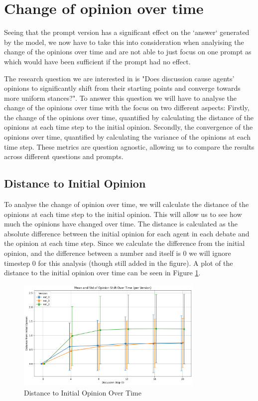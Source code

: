 \documentclass[12pt]{article}
\begin{document}
\section{Change of opinion over time}
Seeing that the prompt version has a significant effect on the `answer` generated by the model, we now have to take this into consideration when analyising the change of the opinions over time and are not able to just focus on one prompt as which would have been sufficient if the prompt had no effect.

The research question we are interested in is "Does discussion cause agents' opinions to significantly shift from their starting points and converge towards more uniform stances?". To answer this question we will have to analyse the change of the opinions over time with the focus on two different aspects: Firstly, the change of the opinions over time, quantified by calculating the distance of the opinions at each time step to the initial opinion. Secondly, the convergence of the opinions over time, quantified by calculating the variance of the opinions at each time step. These metrics are question agnostic, allowing us to compare the results across different questions and prompts.

\subsection{Distance to Initial Opinion}

To analyse the change of opinion over time, we will calculate the distance of the opinions at each time step to the initial opinion. This will allow us to see how much the opinions have changed over time. The distance is calculated as the absolute difference between the initial opinion for each agent in each debate and the opinion at each time step. Since we calculate the difference from the initial opinion, and the difference between a number and itself is 0 we will ignore timestep 0 for this analysis (though still added in the figure). A plot of the distance to the initial opinion over time can be seen in Figure \ref{fig:distance_to_initial_opinion}.

\begin{figure}[h]
\centering
\includegraphics[width=0.8\textwidth]{img/distance_to_initial_opinion.png}
\caption{Distance to Initial Opinion Over Time}
\label{fig:distance_to_initial_opinion}
\end{figure}
\end{document}

